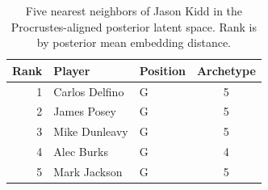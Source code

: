 \begin{table}[htbp]
  \centering\small
  \begin{tabular}{rllc}
    \toprule
    Rank & Player & Position & Archetype \\
    \midrule
    1 & Carlos Delfino & G & 5 \\
    2 & James Posey & G & 5 \\
    3 & Mike Dunleavy & G & 5 \\
    4 & Alec Burks & G & 4 \\
    5 & Mark Jackson & G & 5 \\
    \bottomrule
  \end{tabular}
  \caption{Five nearest neighbors of Jason Kidd in the Procrustes-aligned posterior latent space. Rank is by posterior mean embedding distance.}
  \label{tab:Jason_Kidd_neighbors}
\end{table}

